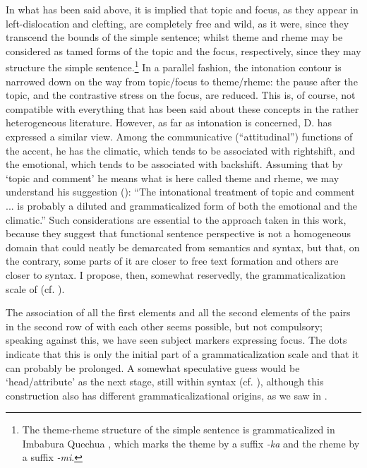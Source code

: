 In what has been said above, it is implied that topic and focus, as they appear in left-dislocation and clefting, are completely free and wild, as it were, since they transcend the bounds of the simple sentence; whilst theme and rheme may be considered as tamed forms of the topic and the focus, respectively, since they may structure the simple sentence.\footnote{The theme-rheme structure of the simple sentence is grammaticalized in Imbabura Quechua \citep[95-98]{Cole1982}, which marks the theme by a suffix \textit{{}-ka} and the rheme by a suffix \textit{{}-mi}.} In a parallel fashion, the intonation contour is narrowed down on the way from topic/focus to theme/rheme: the pause after the topic, and the contrastive stress on the focus, are reduced. This is, of course, not compatible with everything that has been said about these concepts in the rather heterogeneous literature. However, as far as intonation is concerned, D. \citet{Bolinger1978} has expressed a similar view. Among the communicative (“attitudinal”) functions of the accent, he has the climatic, which tends to be associated with rightshift, and the emotional, which tends to be associated with backshift. Assuming that by ‘topic and comment’ he means what is here called theme and rheme, we may understand his suggestion (\citeyear[489]{Bolinger1978}): “The intonational treatment of topic and comment ... is probably a diluted and grammaticalized form of both the emotional and the climatic.” Such considerations are essential to the approach taken in this work, because they suggest that functional sentence perspective is not a homogeneous domain that could neatly be demarcated from semantics and syntax, but that, on the contrary, some parts of it are closer to free text formation and others are closer to syntax. I propose, then, somewhat reservedly, the grammaticalization scale of  (cf. ).

The association of all the first elements and all the second elements of the pairs in the second row of  with each other seems possible, but not compulsory; speaking against this, we have seen subject markers expressing focus. The dots indicate that this is only the initial part of a grammaticalization scale and that it can probably be prolonged. A somewhat speculative guess would be ‘head/attribute’ as the next stage, still within syntax (cf. \citealt[Ch.~\textsc{iv}.2]{Lehmann1984}), although this construction also has different grammaticalizational origins, as we saw in .

